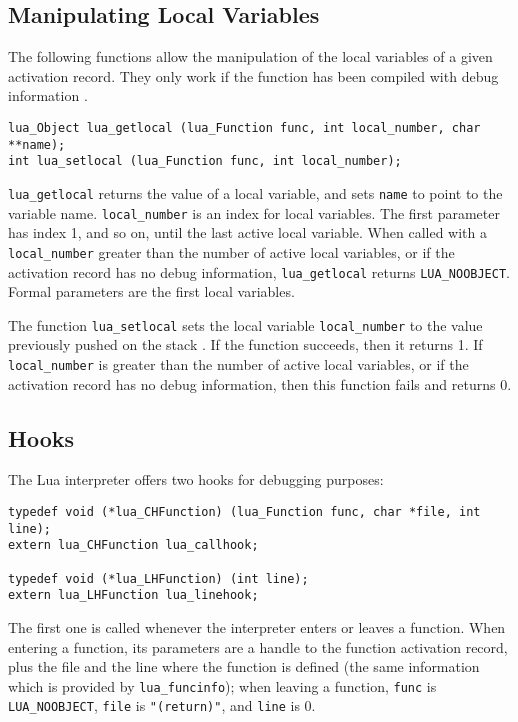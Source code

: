 \subsection{Manipulating Local Variables}

The following functions allow the manipulation of the
local variables of a given activation record.
They only work if the function has been compiled with debug
information .
\begin{verbatim}
lua_Object lua_getlocal (lua_Function func, int local_number, char **name);
int lua_setlocal (lua_Function func, int local_number);
\end{verbatim}
\verb|lua_getlocal| returns the value of a local variable,
and sets \verb'name' to point to the variable name.
\verb'local_number' is an index for local variables.
The first parameter has index 1, and so on, until the
last active local variable.
When called with a \verb'local_number' greater than the
number of active local variables,
or if the activation record has no debug information,
\verb'lua_getlocal' returns \verb'LUA_NOOBJECT'.
Formal parameters are the first local variables.

The function \verb'lua_setlocal' sets the local variable
\verb'local_number' to the value previously pushed on the stack
.
If the function succeeds, then it returns 1.
If \verb'local_number' is greater than the number
of active local variables,
or if the activation record has no debug information,
then this function fails and returns 0.

\subsection{Hooks}

The Lua interpreter offers two hooks for debugging purposes:
\begin{verbatim}
typedef void (*lua_CHFunction) (lua_Function func, char *file, int line);
extern lua_CHFunction lua_callhook;

typedef void (*lua_LHFunction) (int line);
extern lua_LHFunction lua_linehook;
\end{verbatim}
The first one is called whenever the interpreter enters or leaves a
function.
When entering a function,
its parameters are a handle to the function activation record,
plus the file and the line where the function is defined (the same
information which is provided by \verb'lua_funcinfo');
when leaving a function, \verb'func' is \verb'LUA_NOOBJECT',
\verb'file' is \verb'"(return)"', and \verb'line' is 0.


